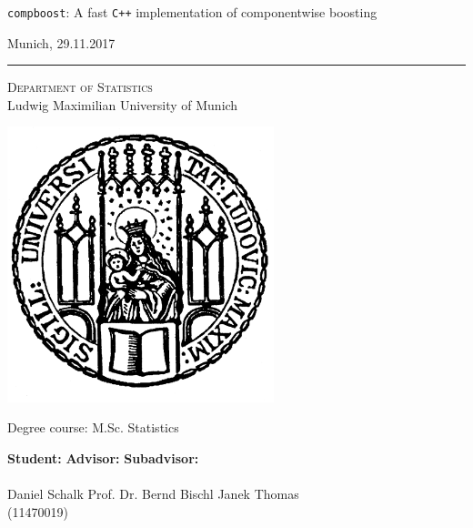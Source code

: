 \Large

\texttt{compboost}: A fast \texttt{C++} implementation of componentwise boosting

\vspace{0.5cm}

\LARGE

Munich, 29.11.2017

\rule{\textwidth}{0.5pt}

\vspace{0.6cm}

\begin{center}
\LARGE
\textsc{Department of Statistics} \\
\Large
Ludwig Maximilian University of Munich
\end{center}

\vspace{0.5cm}

\includegraphics[height=8cm]{images/logos/LMU_logo.pdf}

\flushleft
\Large
\vspace*{\fill}
\begin{center}
Degree course: M.Sc. Statistics
\end{center}
\vspace{0.5cm}
\normalsize

\begin{tabbing}
\=\textbf{Student:}  \hspace{3cm}  \=\textbf{Advisor:}          \hspace{4.5cm}\=\textbf{Subadvisor:} \\ \\ 
\>Daniel Schalk       \> Prof. Dr. Bernd Bischl    \>Janek Thomas\\
\>(11470019)
\end{tabbing}

\thispagestyle{empty}

\normalsize
